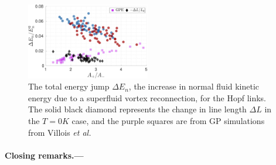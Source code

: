 \documentclass[%
 reprint,
 amsmath,amssymb,
 aps,
 prl,
]{revtex4-2}
\newcommand{\etal}{{\it et al.}~}
\begin{document}
\begin{figure}
	\centering
	\includegraphics*[width=0.48\textwidth]{energy-jump.pdf}
	\caption{The total energy jump $\Delta E_n$, the increase in normal fluid kinetic energy due to a superfluid vortex reconnection, for the Hopf links. The solid black diamond represents the change in line length $\Delta L$ in the $T=0K$ case, and the purple squares are from GP simulations from Villois \etal \cite{villoisIrreversibleDynamicsVortex2020}}
	\label{fig: energy-jumps}
\end{figure}

\paragraph*{Closing remarks.---}


\end{document}
